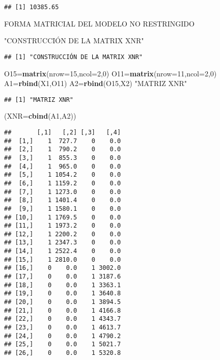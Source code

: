 \documentclass[
]{article}
\newenvironment{Shaded}{\begin{snugshade}}{\end{snugshade}}
\newcommand{\DataTypeTok}[1]{\textcolor[rgb]{0.13,0.29,0.53}{#1}}
\newcommand{\DecValTok}[1]{\textcolor[rgb]{0.00,0.00,0.81}{#1}}
\newcommand{\KeywordTok}[1]{\textcolor[rgb]{0.13,0.29,0.53}{\textbf{#1}}}
\newcommand{\NormalTok}[1]{#1}
\newcommand{\StringTok}[1]{\textcolor[rgb]{0.31,0.60,0.02}{#1}}
\begin{document}
\begin{verbatim}
## [1] 10385.65
\end{verbatim}

FORMA MATRICIAL DEL MODELO NO RESTRINGIDO

\begin{Shaded}
\begin{Highlighting}[]
\StringTok{"CONSTRUCCIÓN DE LA MATRIX XNR"}
\end{Highlighting}
\end{Shaded}

\begin{verbatim}
## [1] "CONSTRUCCIÓN DE LA MATRIX XNR"
\end{verbatim}

\begin{Shaded}
\begin{Highlighting}[]
\NormalTok{O15=}\KeywordTok{matrix}\NormalTok{(}\DataTypeTok{nrow=}\DecValTok{15}\NormalTok{,}\DataTypeTok{ncol=}\DecValTok{2}\NormalTok{,}\DecValTok{0}\NormalTok{)}
\NormalTok{O11=}\KeywordTok{matrix}\NormalTok{(}\DataTypeTok{nrow=}\DecValTok{11}\NormalTok{,}\DataTypeTok{ncol=}\DecValTok{2}\NormalTok{,}\DecValTok{0}\NormalTok{)}
\NormalTok{A1=}\KeywordTok{rbind}\NormalTok{(X1,O11)}
\NormalTok{A2=}\KeywordTok{rbind}\NormalTok{(O15,X2)}
\StringTok{"MATRIZ XNR"}
\end{Highlighting}
\end{Shaded}

\begin{verbatim}
## [1] "MATRIZ XNR"
\end{verbatim}

\begin{Shaded}
\begin{Highlighting}[]
\NormalTok{(}\DataTypeTok{XNR=}\KeywordTok{cbind}\NormalTok{(A1,A2))}
\end{Highlighting}
\end{Shaded}

\begin{verbatim}
##       [,1]   [,2] [,3]   [,4]
##  [1,]    1  727.7    0    0.0
##  [2,]    1  790.2    0    0.0
##  [3,]    1  855.3    0    0.0
##  [4,]    1  965.0    0    0.0
##  [5,]    1 1054.2    0    0.0
##  [6,]    1 1159.2    0    0.0
##  [7,]    1 1273.0    0    0.0
##  [8,]    1 1401.4    0    0.0
##  [9,]    1 1580.1    0    0.0
## [10,]    1 1769.5    0    0.0
## [11,]    1 1973.2    0    0.0
## [12,]    1 2200.2    0    0.0
## [13,]    1 2347.3    0    0.0
## [14,]    1 2522.4    0    0.0
## [15,]    1 2810.0    0    0.0
## [16,]    0    0.0    1 3002.0
## [17,]    0    0.0    1 3187.6
## [18,]    0    0.0    1 3363.1
## [19,]    0    0.0    1 3640.8
## [20,]    0    0.0    1 3894.5
## [21,]    0    0.0    1 4166.8
## [22,]    0    0.0    1 4343.7
## [23,]    0    0.0    1 4613.7
## [24,]    0    0.0    1 4790.2
## [25,]    0    0.0    1 5021.7
## [26,]    0    0.0    1 5320.8
\end{verbatim}
\end{document}
